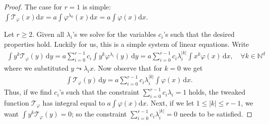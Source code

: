 \begin{proof}
    The case for \(r = 1\) is simple: \(\int \mathcal{T}_{\varphi}(x) \mathrm{d}x = a \int \varphi^{\lambda_0}(x) \mathrm{d}x = a \int \varphi(x) \mathrm{d}x\).  

    Let \(r \geq 2\). Given all \(\lambda_i\)'s we solve for the variables \(c_i\)'s such that the desired properties hold. Luckily for us, this is a simple system of linear equations. Write
    \begin{align*}
        \int y^k \mathcal{T}_{\varphi}(y) \, \mathrm{d}y = a \sum^{r-1}_{i=0} c_i \int y^k \varphi^{\lambda_i}(y) \, \mathrm{d}y =  a \sum^{r-1}_{i=0} c_i \lambda_i^{|k|} \int x^k \varphi(x) \, \mathrm{d}x, \quad \forall k \in \mathbb{N}^d
    \end{align*}
    where we substituted \(y \leadsto \lambda_i x\). Now observe that for \(k = 0\) we get
    \begin{align*}
        \int \mathcal{T}_{\varphi}(y) \, \mathrm{d}y = a \sum^{r-1}_{i=0} c_i \lambda_i^{|k|} \int \varphi(x) \, \mathrm{d}x.
    \end{align*} 
    Thus, if we find \(c_i\)'s  such that the constraint \(\sum^{r-1}_{i=0} c_i \lambda_i= 1\) holds, the tweaked function \(\mathcal{T}_{\varphi}\) has integral equal to \(a \int \varphi(x) \mathrm{d}x\). Next, if we let \(1 \leq |k| \leq r - 1\), we want \(\int y^k \mathcal{T}_{\varphi}(y) = 0\); so the constraint \(\sum^{r-1}_{i=0} c_i \lambda_i^{|k|} = 0\) needs to be satisfied.


\end{proof}
